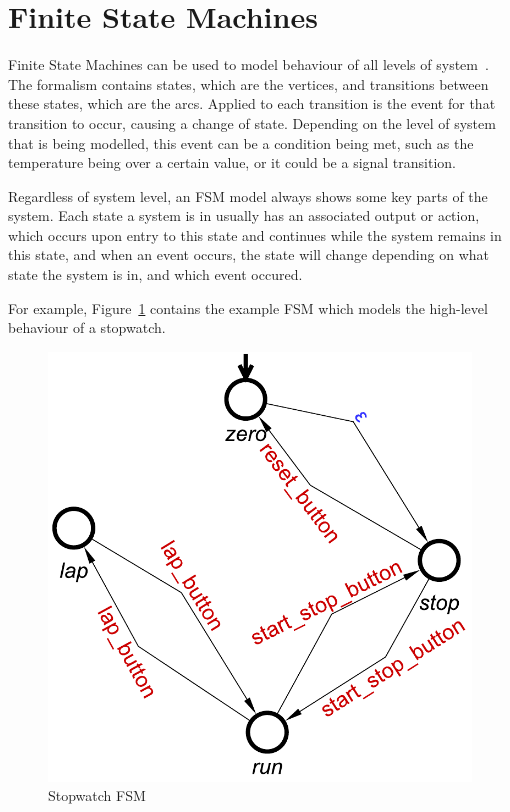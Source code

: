 \newpage
\section {Finite State Machines \label {sec:fsms}}

Finite State Machines can be used to model behaviour of all levels of system~\cite{Taraate2016}. 
The formalism contains states, which are the vertices, and transitions between these states, which 
are the arcs. Applied to each transition is the event for that transition to occur, causing a change 
of state. Depending on the level of system that is being modelled, this event can be a condition being met,
such as the temperature being over a certain value, or it could be a signal transition. 

Regardless of system level, an FSM model always shows some key parts of the system. Each state a system is 
in usually has an associated output or action, which occurs upon entry to this state and continues while the system remains
in this state, and when an event occurs, the state will change depending on what state the system is in, and which event occured. 

For example, Figure~\ref{fig:stopwatch} contains the example FSM which models the 
high-level behaviour of a stopwatch.

\begin{figure}[h]
\begin{centering}
\includegraphics[scale=0.4]{images/stopwatch-fsm}
\par\end{centering}
\protect\caption{\label{fig:stopwatch} Stopwatch FSM}
\end{figure}

